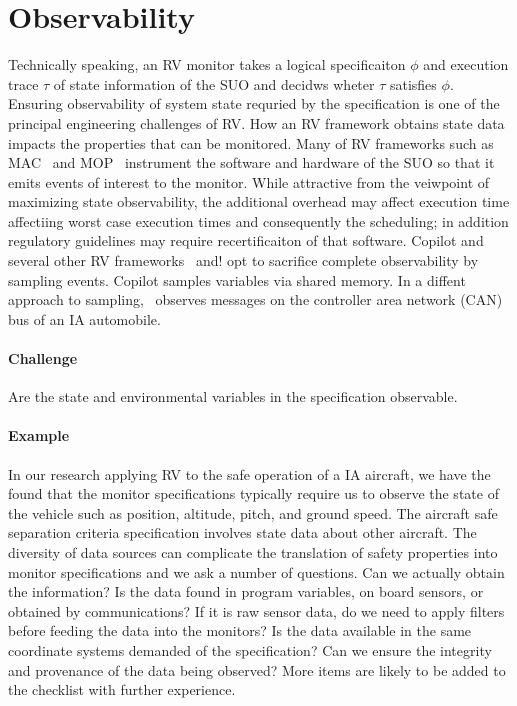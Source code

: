 \section{Observability}\label{sec:observ} 

   Technically speaking, an RV monitor takes a logical specificaiton
  $\phi$ and execution trace $\tau$ of state information of the SUO
  and decidws wheter $\tau$ satisfies $\phi$.  Ensuring observability of
  system state requried by the specification is one of the principal
  engineering challenges of RV.  How an RV framework obtains state
  data impacts the properties that can be monitored. Many of RV
  frameworks such as MAC~\cite{KimLKS04}  and MOP~\cite{ChenR05}
  instrument the software and hardware of the SUO so that it emits
  events of interest to the monitor.  While attractive from the
  veiwpoint of maximizing state observability, the additional overhead
  may affect execution time affectiing worst case
  execution times and consequently the scheduling; in addition regulatory
  guidelines may require recertificaiton of that software.  Copilot
  and several other RV frameworks~\cite{sampling} and!\cite{borzoo}
  opt to sacrifice complete observability by sampling
  events.  Copilot samples variables via shared memory. In a diffent approach
  to sampling,~\cite{Kane15} observes messages on  the controller area
  network (CAN)  bus of  an IA
  automobile.   

\paragraph{Challenge} Are the state and environmental variables in the
specification  observable.   

  \paragraph{Example} In our research applying RV to  the safe operation of a IA aircraft,
  we have the found that  the monitor specifications typically require
  us to observe  the state of the vehicle such  as position, altitude,
  pitch,  and ground  speed.   The aircraft  safe separation  criteria
  specification  involves   state  data  about  other   aircraft.  The
  diversity of data  sources can complicate the  translation of safety
  properties  into  monitor specifications  and  we  ask a  number  of
  questions.  Can  we actually  obtain the  information?  Is  the data
  found  in  program  variables,  on board  sensors,  or  obtained  by
  communications?  If it  is  raw sensor  data, do  we  need to  apply
  filters  before feeding  the data  into  the monitors?  Is the  data
  available   in  the   same  coordinate   systems  demanded   of  the
  specification?  Can  we ensure the  integrity and provenance  of the
  data  being observed?  More  items are  likely to  be  added to  the
  checklist with further experience.

